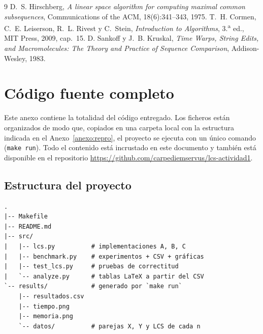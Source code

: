\documentclass[11pt,a4paper]{article}
\begin{document}
\begin{thebibliography}{9}
 D.~S. Hirschberg, \emph{A linear space
algorithm for computing maximal common subsequences}, Communications of
the ACM, 18(6):341--343, 1975.
 T.~H. Cormen, C.~E. Leiserson, R.~L. Rivest y
C.~Stein, \emph{Introduction to Algorithms}, 3.\textsuperscript{a} ed.,
MIT Press, 2009, cap.~15.
 D. Sankoff y J.~B. Kruskal, \emph{Time Warps, String
Edits, and Macromolecules: The Theory and Practice of Sequence
Comparison}, Addison-Wesley, 1983.
\end{thebibliography}

\clearpage
\appendix
{}

\section{Código fuente completo}\label{anexo:codigo}

Este anexo contiene la totalidad del código entregado. Los ficheros
están organizados de modo que, copiados en una carpeta local con la
estructura indicada en el Anexo~\ref{anexo:repro}, el proyecto se
ejecuta con un único comando (\texttt{make run}). Todo el contenido está
incrustado en este documento y también está disponible en el repositorio
\url{https://github.com/carpediemservus/lcs-actividad1}.

\subsection{Estructura del proyecto}

\begin{verbatim}
.
|-- Makefile
|-- README.md
|-- src/
|   |-- lcs.py          # implementaciones A, B, C
|   |-- benchmark.py    # experimentos + CSV + gráficas
|   |-- test_lcs.py     # pruebas de correctitud
|   `-- analyze.py      # tablas LaTeX a partir del CSV
`-- results/            # generado por `make run`
    |-- resultados.csv
    |-- tiempo.png
    |-- memoria.png
    `-- datos/          # parejas X, Y y LCS de cada n
\end{verbatim}
\end{document}
